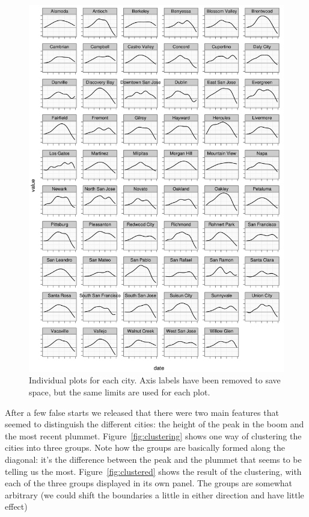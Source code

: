 \documentclass[oneside]{article}
\begin{document}
\begin{figure}[htbp]
  \centering
  \includegraphics[width=0.9 \linewidth]{cities-individual}
  \caption{Individual plots for each city.  Axis labels have been removed to save space, but the same limits are used for each plot.}
  \label{fig:individual}
\end{figure}

After a few false starts we released that there were two main features that seemed to distinguish the different cities: the height of the peak in the boom and the most recent plummet.  Figure~\ref{fig:clustering} shows one way of clustering the cities into three groups.  Note how the groups are basically formed along the diagonal: it's the difference between the peak and the plummet that seems to be telling us the most.  Figure~\ref{fig:clustered} shows the result of the clustering, with each of the three groups displayed in its own panel.  The groups are somewhat arbitrary (we could shift the boundaries a little in either direction and have little effect)
\end{document}
